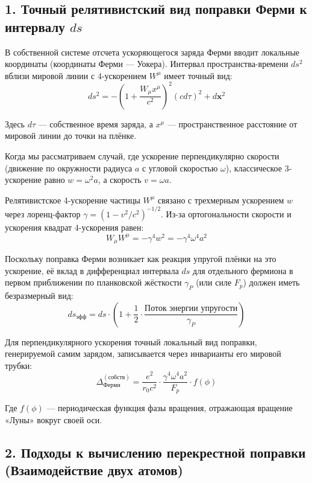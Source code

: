 \documentclass[12pt,a4paper]{article}
\begin{document}
\subsection*{1. Точный релятивистский вид поправки Ферми к интервалу $ds$}

В собственной системе отсчета ускоряющегося заряда Ферми вводит локальные координаты (координаты Ферми — Уокера). Интервал пространства-времени $ds^2$ вблизи мировой линии с 4-ускорением $W^\mu$ имеет точный вид:
\begin{equation}
ds^2 = -\left(1 + \frac{W_\mu x^\mu}{c^2}\right)^2 (c d\tau)^2 + d\mathbf{x}^2
\end{equation}

Здесь $d\tau$ — собственное время заряда, а $x^\mu$ — пространственное расстояние от мировой линии до точки на плёнке.

Когда мы рассматриваем случай, где ускорение перпендикулярно скорости (движение по окружности радиуса $a$ с угловой скоростью $\omega$), классическое 3-ускорение равно $w = \omega^2 a$, а скорость $v = \omega a$.

Релятивистское 4-ускорение частицы $W^\mu$ связано с трехмерным ускорением $w$ через лоренц-фактор $\gamma = (1 - v^2/c^2)^{-1/2}$. Из-за ортогональности скорости и ускорения квадрат 4-ускорения равен:
\begin{equation}
W_\mu W^\mu = -\gamma^4 w^2 = -\gamma^4 \omega^4 a^2
\end{equation}

Поскольку поправка Ферми возникает как реакция упругой плёнки на это ускорение, её вклад в дифференциал интервала $ds$ для отдельного фермиона в первом приближении по планковской жёсткости $\gamma_P$ (или силе $F_p$) должен иметь безразмерный вид:
\begin{equation}
ds_{эфф} = ds \cdot \left( 1 + \frac{1}{2} \cdot \frac{\text{Поток энергии упругости}}{\gamma_P} \right)
\end{equation}

Для перпендикулярного ускорения точный локальный вид поправки, генерируемой самим зарядом, записывается через инварианты его мировой трубки:
\begin{equation}
\Delta_{Ферми}^{(собств)} = \frac{e^2}{r_0 c^2} \cdot \frac{\gamma^4 \omega^4 a^2}{F_p} \cdot f(\phi)
\end{equation}

Где $f(\phi)$ — периодическая функция фазы вращения, отражающая вращение «Луны» вокруг своей оси.

\subsection*{2. Подходы к вычислению перекрестной поправки (Взаимодействие двух атомов)}
\end{document}
